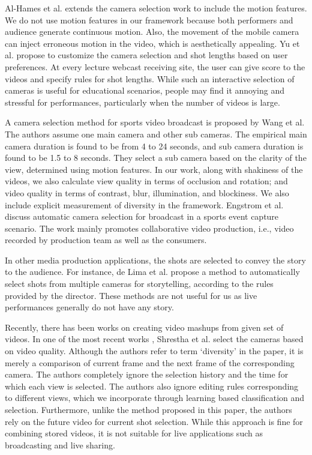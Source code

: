 \documentclass{new}
\begin{document}
Al-Hames et al.\cite{rfc3} extends the camera selection work to include
the motion features. We do not use motion features in our framework
because both performers and audience generate continuous
motion. Also, the movement of the mobile camera can inject erroneous
motion in the video, which is aesthetically appealing. Yu et
al. \cite{rfc20} propose to customize the camera selection and shot lengths
based on user preferences. At every lecture webcast receiving site,
the user can give score to the videos and specify rules for shot
lengths. While such an interactive selection of cameras is useful
for educational scenarios, people may find it annoying and stressful
for performances, particularly when the number of videos is
large.

A camera selection method for sports video broadcast is proposed
by Wang et al.\cite{rfc16} The authors assume one main camera
and other sub cameras. The empirical main camera duration is
found to be from 4 to 24 seconds, and sub camera duration is found
to be 1.5 to 8 seconds. They select a sub camera based on the clarity
of the view, determined using motion features. In our work,
along with shakiness of the videos, we also calculate view quality
in terms of occlusion and rotation; and video quality in terms
of contrast, blur, illumination, and blockiness. We also include
explicit measurement of diversity in the framework. Engstrom et
al.\cite{rfc8} discuss automatic camera selection for broadcast in a sports
event capture scenario. The work mainly promotes collaborative
video production, i.e., video recorded by production team as well
as the consumers.

In other media production applications, the shots are selected to
convey the story to the audience. For instance, de Lima et al.\cite{rfc7} propose a method to automatically select shots from multiple cameras
for storytelling, according to the rules provided by the director.
These methods are not useful for us as live performances generally
do not have any story.

Recently, there has been works on creating video mashups from
given set of videos. In one of the most recent works \cite{rfc15}, Shrestha
et al. select the cameras based on video quality. Although the authors
refer to term `diversity' in the paper, it is merely a comparison
of current frame and the next frame of the corresponding camera.
The authors completely ignore the selection history and the
time for which each view is selected. The authors also ignore editing
rules corresponding to different views, which we incorporate
through learning based classification and selection. Furthermore,
unlike the method proposed in this paper, the authors rely on the
future video for current shot selection. While this approach is fine
for combining stored videos, it is not suitable for live applications
such as broadcasting and live sharing.
\end{document}
